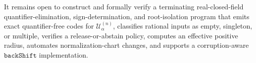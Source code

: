 It remains open to construct and formally verify a terminating real-closed-field quantifier-elimination, sign-determination, and root-isolation program that emits exact quantifier-free codes for \(\mathcal U^{(n)}_\alpha\), classifies rational inputs as empty, singleton, or multiple, verifies a release-or-abstain policy, computes an effective positive radius, automates normalization-chart changes, and supports a corruption-aware \(\texttt{backShift}\) implementation.